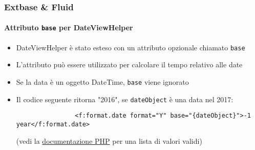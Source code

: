 \begin{frame}[fragile]
	\frametitle{Extbase \& Fluid}
	\framesubtitle{Attributo \texttt{base} per DateViewHelper}


	\begin{itemize}

		\item DateViewHelper è stato esteso con un attributo opzionale chiamato \texttt{base}
		\item L'attributo può essere utilizzato per calcolare il tempo relativo alle date
		\item Se la data è un oggetto DateTime, \texttt{base} viene ignorato
		\item Il codice seguente ritorna "2016", se \texttt{dateObject} è una data nel 2017:

			\begin{lstlisting}
				<f:format.date format="Y" base="{dateObject}">-1 year</f:format.date>
			\end{lstlisting}

		\small
			(vedi la \href{http://www.php.net/manual/en/datetime.formats.relative.php}{documentazione PHP} per una lista di valori validi)
		\normalsize

	\end{itemize}

\end{frame}


